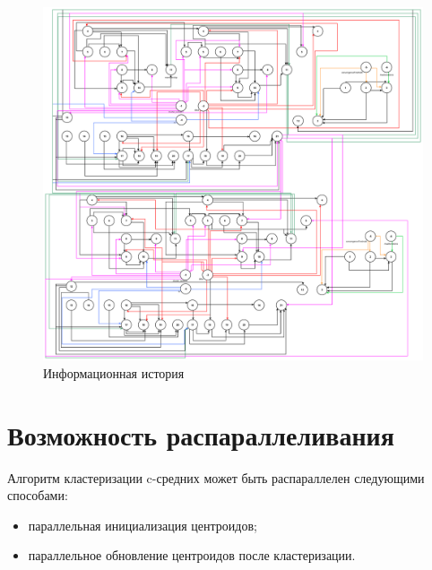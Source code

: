 \begin{figure}[H]
    \centering
    \includegraphics[width=1.0\textwidth, pages=-]{images/info_history.pdf}
    \caption{Информационная история}
    \label{fig:info-hist-graph}
\end{figure}

\chapter*{Возможность распараллеливания}

Алгоритм кластеризации c-средних может быть распараллелен следующими способами:
\begin{itemize}
    \item параллельная инициализация центроидов;
    \item параллельное обновление центроидов после кластеризации.
\end{itemize}